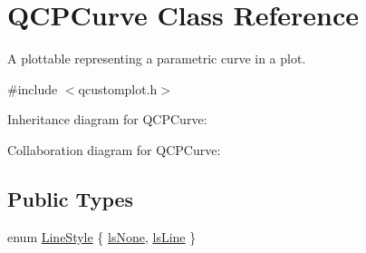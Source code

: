 \hypertarget{class_q_c_p_curve}{}\section{Q\+C\+P\+Curve Class Reference}
\label{class_q_c_p_curve}


A plottable representing a parametric curve in a plot.  




{\ttfamily \#include $<$qcustomplot.\+h$>$}



Inheritance diagram for Q\+C\+P\+Curve\+:


Collaboration diagram for Q\+C\+P\+Curve\+:
\subsection*{Public Types}
\begin{DoxyCompactItemize}
\item 
enum \hyperlink{class_q_c_p_curve_a2710e9f79302152cff794c6e16cc01f1}{Line\+Style} \{ \hyperlink{class_q_c_p_curve_a2710e9f79302152cff794c6e16cc01f1aec1601a191cdf0b4e761c4c66092cc48}{ls\+None}, 
\hyperlink{class_q_c_p_curve_a2710e9f79302152cff794c6e16cc01f1ade5822ce6fbf131d3df131795c2e1003}{ls\+Line}
 \}
\end{DoxyCompactItemize}
